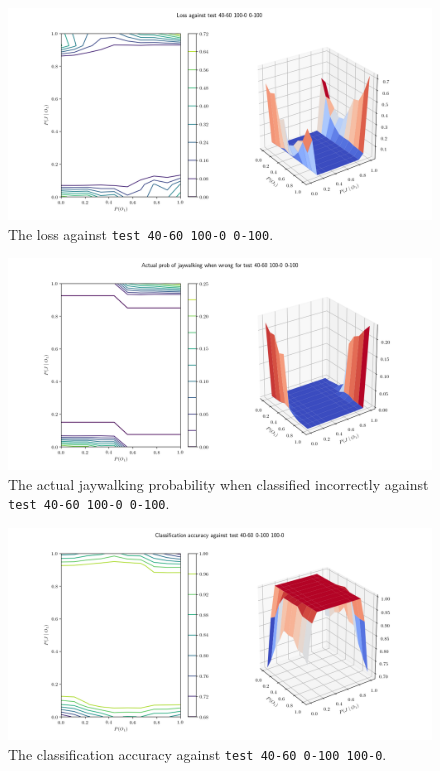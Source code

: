 \documentclass{report}
\newcommand{\code}{\texttt}
\begin{document}
\begin{figure}[h]
    \centering
    \centerline{\includegraphics[scale=0.55]{test_40-60_100-0_0-100_loss.png}}
    \caption[]{The loss against \code{test 40-60 100-0 0-100}.}
    \label{fig:test_40-60_100-0_0-100_loss_plot}
\end{figure}

\begin{figure}[h]
    \centering
    \centerline{\includegraphics[scale=0.55]{test_40-60_100-0_0-100_jay_prob.png}}
    \caption[]{The actual jaywalking probability when classified incorrectly against \code{test 40-60 100-0 0-100}.}
    \label{fig:test_40-60_100-0_0-100_jay_prob_plot}
\end{figure}

% 
% 

\begin{figure}[h]
    \centering
    \centerline{\includegraphics[scale=0.55]{test_40-60_0-100_100-0_accuracy.png}}
    \caption[]{The classification accuracy against \code{test 40-60 0-100 100-0}.}
    \label{fig:test_40-60_0-100_100-0_accuracy_plot}
\end{figure}
\end{document}
